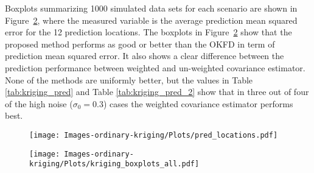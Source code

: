 Boxplots summarizing 1000 simulated data sets for each scenario are shown in Figure~\ref{fig:boxplots pred mse}, where the measured variable is the average prediction mean squared error for the 12 prediction locations. The boxplots in Figure~\ref{fig:boxplots pred mse} show that the proposed method performs as good or better than the OKFD in term of prediction mean squared error. It also shows a clear difference between the prediction performance between weighted and un-weighted covariance estimator. None of the methods are uniformly better, but the values in Table \ref{tab:kriging_pred} and Table \ref{tab:kriging_pred_2} show that in three out of four of the high noise ($\sigma_0 = 0.3$) cases the weighted covariance estimator performs best.  
 

\begin{figure}
	\begin{center}
		\texttt{[image: Images-ordinary-kriging/Plots/pred\_locations.pdf]} 
	\end{center}
	 \label{fig:pred locations} 
\end{figure}
\begin{figure}
	\begin{center}
		\texttt{[image: Images-ordinary-kriging/Plots/kriging\_boxplots\_all.pdf]} 
	\end{center}
	\label{fig:boxplots pred mse} 
\end{figure}




